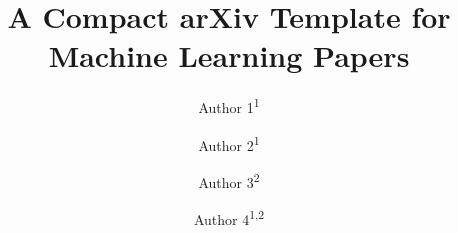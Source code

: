 \documentclass[11pt]{article}
\title{A Compact arXiv Template for Machine Learning Papers}
\author{
  Author 1\textsuperscript{1\coremark} \and
  Author 2\textsuperscript{1\coremark} \and
  Author 3\textsuperscript{2} \and
  Author 4\textsuperscript{1,2}
}
\institute{\textsuperscript{1}The Ohio State University \and \textsuperscript{2}Example Research Lab}
\begin{document}
\maketitle

\begin{abstract}

\end{abstract}

\begin{figure}[H]
\centering

\end{figure}

\arxivoutline








\arxivappendix



\end{document}

